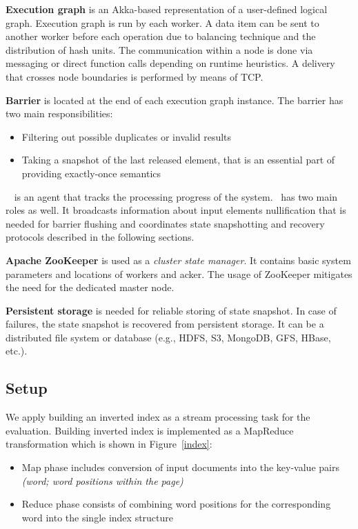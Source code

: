 {\bf Execution graph} is an Akka-based representation of a user-defined logical graph. Execution graph is run by each worker. A data item can be sent to another worker before each operation due to balancing technique and the distribution of hash units. The communication within a node is done via messaging or direct function calls depending on runtime heuristics. A delivery that crosses node boundaries is performed by means of TCP.

{\bf Barrier} is located at the end of each execution graph instance. The barrier has two main responsibilities:

\begin{itemize}
    \item Filtering out possible duplicates or invalid results
    \item Taking a snapshot of the last released element, that is an essential part of providing exactly-once semantics
\end{itemize}

{\bf \Acker\ } is an agent that tracks the processing progress of the system. \Acker\ has two main roles as well. It broadcasts information about input elements nullification that is needed for barrier flushing and coordinates state snapshotting and recovery protocols described in the following sections.

{\bf Apache ZooKeeper} is used as a {\it cluster state manager}. It contains basic system parameters and locations of workers and acker. The usage of ZooKeeper mitigates the need for the dedicated master node.

{\bf Persistent storage} is needed for reliable storing of state snapshot. In case of failures, the state snapshot is recovered from persistent storage. It can be a distributed file system or database (e.g., HDFS, S3, MongoDB, GFS, HBase, etc.).

\subsection{Setup}
We apply building an inverted index as a stream processing task for the evaluation. Building inverted index is implemented as a MapReduce transformation which is shown in Figure~\ref{index}: 

\begin{itemize}
    \item Map phase includes conversion of input documents into the key-value pairs {\it (word; word positions within the page)}
    \item Reduce phase consists of combining word positions for the corresponding word into the single index structure 
\end{itemize}

